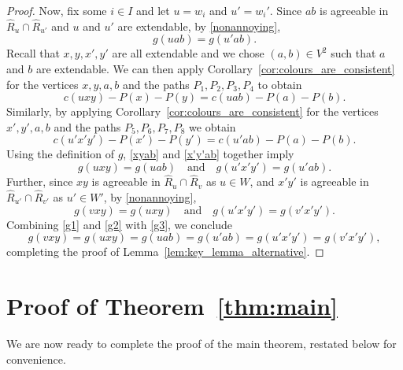 \documentclass[A4paper,12pt]{article}
\theoremstyle{definition}
\begin{document}
\begin{proof}[Proof]
Now, fix some $i\in I$ and let $u=w_i$ and $u'=w_i'$. Since $ab$ is agreeable in $\hat{R}_u\cap \hat{R}_{u'}$ and $u$ and $u'$ are extendable, by \eqref{nonannoying}, 
\begin{equation}
\label{g1}
g(uab)=g(u'ab).
\end{equation} Recall that $x, y, x', y'$ are all extendable and we chose $(a,b) \in V^2$ such that $a$ and $b$ are extendable. We can then apply Corollary~\ref{cor:colours_are_consistent} for the vertices $x,y,a,b$ and the paths $P_1,P_2,P_3,P_4$ to obtain 
\begin{equation}
\label{xyab}
c(uxy)-P(x)-P(y)=c(uab)-P(a)-P(b). 
\end{equation}
Similarly, by applying Corollary~\ref{cor:colours_are_consistent} for the vertices $x',y',a,b$ and the paths $P_5,P_6,P_7,P_8$ we obtain 
\begin{equation}
\label{x'y'ab}
c(u'x'y')-P(x')-P(y')=c(u'ab)-P(a)-P(b).
\end{equation}
Using the definition of $g$, \eqref{xyab} and \eqref{x'y'ab} together imply 
\begin{equation}
\label{g2}
g(uxy)=g(uab) \quad \text{and} \quad g(u'x'y')=g(u'ab).
\end{equation}
Further, since $xy$ is agreeable in $\hat{R}_u\cap \hat{R}_v$ as $u \in W$, and $x'y'$ is agreeable in $\hat{R}_{u'}\cap \hat{R}_{v'}$ as $u' \in W'$, by \eqref{nonannoying}, 
\begin{equation}
\label{g3}
g(vxy)=g(uxy) \quad \text{and} \quad g(u'x'y')=g(v'x'y').
\end{equation}
Combining \eqref{g1} and \eqref{g2} with \eqref{g3}, we conclude    \[g(vxy) = g(uxy) = g(uab) = g(u'ab) = g(u'x'y') = g(v'x'y'),\]
completing the proof of Lemma~\ref{lem:key_lemma_alternative}.    
\end{proof}



\section{Proof of Theorem~\ref{thm:main}}
\label{sec:fews}

We are now ready to complete the proof of the main theorem, restated below for convenience. 
\main*
\end{document}
